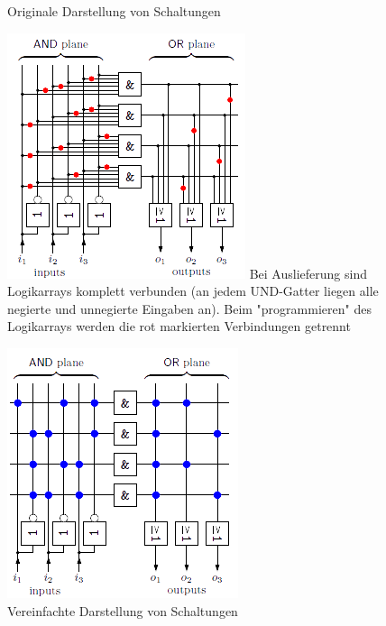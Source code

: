 \documentclass[12pt]{report}
\begin{document}
\begin{figure}[h]
  \begin{minipage}[t]{0.45\textwidth}
    \caption{Originale Darstellung von Schaltungen}
    \includegraphics[height=\textwidth]{PLA_implementation}
    Bei Auslieferung sind Logikarrays komplett verbunden (an jedem UND-Gatter liegen alle negierte und unnegierte Eingaben an).
    Beim "programmieren" des Logikarrays werden die rot markierten Verbindungen getrennt
  \end{minipage}
  \hfill
  \begin{minipage}[t]{0.45\textwidth}
    \caption{Vereinfachte Darstellung von Schaltungen}
    \includegraphics[height=\textwidth]{PLA_implementation_simplification}

\end{minipage}
\end{figure}
\end{document}
